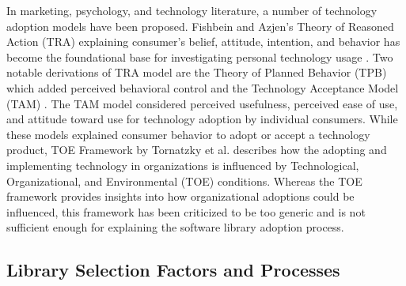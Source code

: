
In marketing, psychology, and technology literature, a number of technology adoption models have been proposed. Fishbein and Azjen's Theory of Reasoned Action (TRA) \cite{flanders1975belief-tra} explaining consumer's belief, attitude, intention, and behavior has become the foundational base for investigating personal technology usage \cite{taherdoost2018-adoption-models}. Two notable derivations of TRA model are the Theory of Planned Behavior (TPB) \cite{ajzen1991-tpb} which added perceived behavioral control and the Technology Acceptance Model (TAM) \cite{davis1985tam, davis1989-tam-usefulness}. The TAM model considered perceived usefulness, perceived ease of use, and attitude toward use for technology adoption by individual consumers. While these models explained consumer behavior to adopt or accept a technology product, TOE Framework by Tornatzky et al. \cite{tornatzky1990processes-toe} describes how the adopting and implementing technology in organizations is influenced by Technological, Organizational, and Environmental (TOE) conditions. Whereas the TOE framework provides insights into how organizational adoptions could be influenced, this framework has been criticized to be too generic \cite{zhu2005post-toe-critic} and is not sufficient enough for explaining the software library adoption process.



\subsection{Library Selection Factors and Processes}\label{sec:lit:processes}

